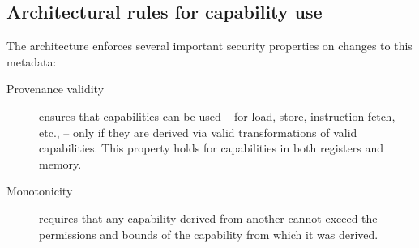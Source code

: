 \documentclass[12pt,twoside,openright,a4paper]{article}
\newcommand{\note}[2]{{\color{blue}[ Note: #1 - #2]}}
\renewcommand{\note}[2]{\relax\ifhmode\unskip\fi}
\newcommand{\rwnote}[1]{\note{#1}{Robert W.}}
\newcommand{\psnote}[1]{\note{#1}{Peter S.}}
\newcommand{\pgnnote}[1]{\note{#1}{Peter N.}}
\begin{document}
\subsection{Architectural rules for capability use}

The architecture enforces several important security properties on changes to
this metadata:

\begin{description}
\item[Provenance validity] ensures that capabilities can be used -- for
  load, store, instruction fetch, etc., -- only if they are derived via valid
  transformations of valid capabilities.
  This property holds for capabilities in both registers and memory.



  
\item[Monotonicity] requires that any capability derived from another
  cannot exceed the permissions and bounds of the capability from which it was derived.

  
\end{description}
\end{document}
